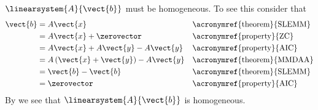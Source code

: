 $\linearsystem{A}{\vect{b}}$ must be homogeneous.  To see this consider that 
%
\begin{align*}
\vect{b}
&=A\vect{x}&&\text{\acronymref{theorem}{SLEMM}}\\
&=A\vect{x}+\zerovector&&\text{\acronymref{property}{ZC}}\\
&=A\vect{x}+A\vect{y}-A\vect{y}&&\text{\acronymref{property}{AIC}}\\
&=A\left(\vect{x}+\vect{y}\right)-A\vect{y}&&\text{\acronymref{theorem}{MMDAA}}\\
&=\vect{b}-\vect{b}&&\text{\acronymref{theorem}{SLEMM}}\\
&=\zerovector&&\text{\acronymref{property}{AIC}}
\end{align*}
%
By  we see that $\linearsystem{A}{\vect{b}}$ is homogeneous.
